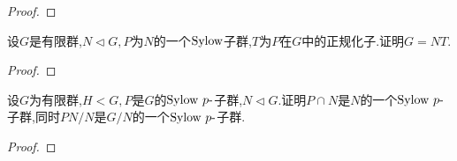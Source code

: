 \begin{proof}
    \stars
\end{proof}
\begin{problem}[P98T33]
    设$G$是有限群,$N\lhd G,P$为$N$的一个$\mathrm{Sylow}$子群,$T$为$P$在$G$中的正规化子.证明$G=NT$.
\end{problem}
\begin{proof}
    \stars
\end{proof}
\begin{problem}[P98T35]
    设$G$为有限群,$H<G,P$是$G$的$\mathrm{Sylow}\ p\text{-}$子群,$N\lhd G$.证明$P\cap N$是$N$的一个$\mathrm{Sylow}\ p\text{-}$子群,同时$PN/N$是$G/N$的一个$\mathrm{Sylow}\ p\text{-}$子群.
\end{problem}
\begin{proof}
    \stars
\end{proof}